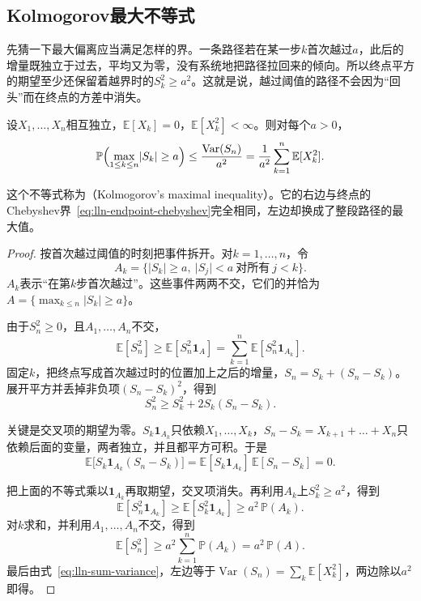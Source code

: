 \subsection{Kolmogorov最大不等式}
\label{sec:lln-maximal-inequality}

先猜一下最大偏离应当满足怎样的界。一条路径若在某一步$k$首次越过$a$，此后的增量既独立于过去，平均又为零，没有系统地把路径拉回来的倾向。所以终点平方的期望至少还保留着越界时的$S_k^2\geq a^2$。这就是说，越过阈值的路径不会因为“回头”而在终点的方差中消失。

\begin{theorem}[Kolmogorov最大不等式]
\label{thm:lln-kolmogorov-maximal}
设$X_1,\dots,X_n$相互独立，$\mathbb{E}[X_k]=0$，$\mathbb{E}[X_k^2]<\infty$。则对每个$a>0$，
\begin{equation}
 \mathbb{P}\Bigl(\max_{1\leq k\leq n}\lvert S_k\rvert\geq a\Bigr)\leq\frac{\operatorname{Var}(S_n)}{a^2}=\frac{1}{a^2}\sum_{k=1}^{n}\mathbb{E}[X_k^2] .
 \label{eq:lln-kolmogorov-maximal}
\end{equation}
\end{theorem}

这个不等式称为（Kolmogorov's maximal inequality）。它的右边与终点的Chebyshev界~\eqref{eq:lln-endpoint-chebyshev}完全相同，左边却换成了整段路径的最大值。

\begin{proof}
按首次越过阈值的时刻把事件拆开。对$k=1,\dots,n$，令
\[
 A_k=\bigl\{\lvert S_k\rvert\geq a,\ \lvert S_j\rvert<a\ \text{对所有}\ j<k\bigr\} .
\]
$A_k$表示“在第$k$步首次越过”。这些事件两两不交，它们的并恰为$A=\{\max_{k\leq n}\lvert S_k\rvert\geq a\}$。

由于$S_n^2\geq0$，且$A_1,\dots,A_n$不交，
\[
 \mathbb{E}[S_n^2]\geq\mathbb{E}[S_n^2\mathbf{1}_{A}]=\sum_{k=1}^{n}\mathbb{E}[S_n^2\mathbf{1}_{A_k}] .
\]
固定$k$，把终点写成首次越过时的位置加上之后的增量，$S_n=S_k+(S_n-S_k)$。展开平方并丢掉非负项$(S_n-S_k)^2$，得到
\[
 S_n^2\geq S_k^2+2S_k(S_n-S_k) .
\]

关键是交叉项的期望为零。$S_k\mathbf{1}_{A_k}$只依赖$X_1,\dots,X_k$，$S_n-S_k=X_{k+1}+\dots+X_n$只依赖后面的变量，两者独立，并且都平方可积。于是
\[
 \mathbb{E}\bigl[S_k\mathbf{1}_{A_k}(S_n-S_k)\bigr]=\mathbb{E}[S_k\mathbf{1}_{A_k}]\,\mathbb{E}[S_n-S_k]=0 .
\]

把上面的不等式乘以$\mathbf{1}_{A_k}$再取期望，交叉项消失。再利用$A_k$上$S_k^2\geq a^2$，得到
\[
 \mathbb{E}[S_n^2\mathbf{1}_{A_k}]\geq\mathbb{E}[S_k^2\mathbf{1}_{A_k}]\geq a^2\,\mathbb{P}(A_k) .
\]
对$k$求和，并利用$A_1,\dots,A_n$不交，得到
\[
 \mathbb{E}[S_n^2]\geq a^2\sum_{k=1}^{n}\mathbb{P}(A_k)=a^2\,\mathbb{P}(A) .
\]
最后由式~\eqref{eq:lln-sum-variance}，左边等于$\operatorname{Var}(S_n)=\sum_k\mathbb{E}[X_k^2]$，两边除以$a^2$即得。
\end{proof}

